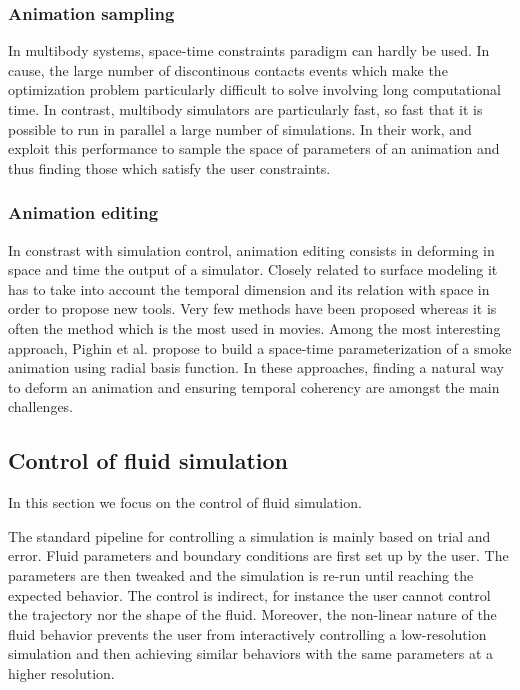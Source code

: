 \subsubsection{Animation sampling}
In multibody systems, space-time constraints paradigm can hardly be used. In cause, the large number of discontinous contacts events which make the optimization problem particularly difficult to solve involving long computational time. In contrast, multibody simulators are particularly fast, so fast that it is possible to run in parallel a large number of simulations. In their work, \cite{Chenney2000} and \cite{Twigg2007} exploit this performance to sample the space of parameters of an animation and thus finding those which satisfy the user constraints. 

\subsubsection{Animation editing} 
In constrast with simulation control, animation editing consists in deforming in space and time the output of a simulator. Closely related to surface modeling it has to take into account the temporal dimension and its relation with space in order to propose new tools. Very few methods have been proposed whereas it is often the method which is the most used in movies. Among the most interesting approach, Pighin et al.\cite{Pighin2004} propose to build a space-time parameterization of a smoke animation using radial basis function. In these approaches, finding a natural way to deform an animation and ensuring temporal coherency are amongst the main challenges.

\subsection{Control of fluid simulation}

In this section we focus on the control of fluid simulation.

The standard pipeline for controlling a simulation is mainly based on trial and error. Fluid parameters and boundary conditions are first set up by the user. The parameters are then tweaked and the simulation is re-run until reaching the expected behavior. The control is indirect, for instance the user cannot control the trajectory nor the shape of the fluid. Moreover, the non-linear nature of the fluid behavior prevents the user from interactively controlling a low-resolution simulation and then achieving similar behaviors with the same parameters at a higher resolution.

